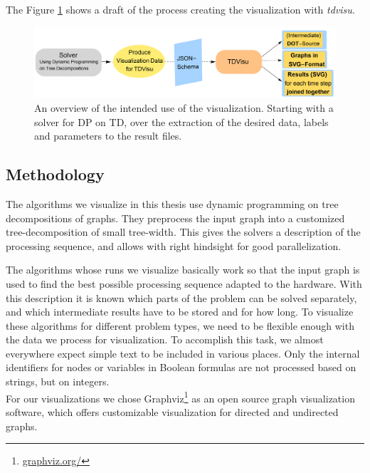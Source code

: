 \documentclass[a4paper, 12pt, bibliography=totoc]{scrartcl}
\begin{document}
The Figure \ref{fig:overviewprog} shows a draft of the process creating the visualization with \textit{tdvisu}.

\begin{figure}
	\centering
		\includegraphics[width=1\linewidth]{images/OverviewProgram.png}
		
	\caption[Visualization Overview]{An overview of the intended use of the visualization. Starting with a solver for DP on TD, over the extraction of the desired data, labels and parameters to the result files.}
	\label{fig:overviewprog}
\end{figure}


\subsection{Methodology}

The algorithms we visualize in this thesis use dynamic programming on tree decompositions of graphs.
They preprocess the input graph into a customized tree-decomposition of small tree-width.
This gives the solvers a description of the processing sequence, and allows 
with right hindsight for good parallelization.

The algorithms whose runs we visualize basically work so that the input graph is used to find the best possible processing sequence adapted to the hardware.
With this description it is known which parts of the problem can be solved separately, and which intermediate results have to be stored and for how long. To visualize these algorithms for different problem types, we need to be flexible enough with the data we process for visualization. To accomplish this task, we almost everywhere expect simple text to be included in various places. Only the internal identifiers for nodes or variables in Boolean formulas are not processed based on strings, but on integers.\\

For our visualizations we chose {Graphviz}\footnote{\url{graphviz.org/}} as an open source graph visualization software, which offers customizable visualization for directed and undirected graphs.
\end{document}
